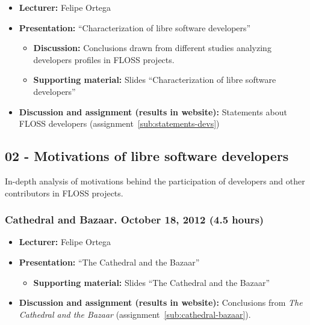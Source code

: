 \documentclass[a4paper]{article}
\begin{document}
\begin{itemize}
\item \textbf{Lecturer:} Felipe Ortega
\item \textbf{Presentation:} ``Characterization of libre software developers''
  \begin{itemize}
  \item \textbf{Discussion:} Conclusions drawn from different studies analyzing developers profiles in FLOSS projects.
  \item \textbf{Supporting material:} Slides ``Characterization of libre software developers''
  \end{itemize}
\item \textbf{Discussion and assignment (results in website):} Statements about FLOSS developers (assignment~\ref{sub:statements-devs})
\end{itemize}

\subsection{02 - Motivations of libre software developers}

In-depth analysis of motivations behind the participation of developers and other contributors in FLOSS projects.

\subsubsection{Cathedral and Bazaar. October 18, 2012 (4.5 hours)}

\begin{itemize}
\item \textbf{Lecturer:} Felipe Ortega
\item \textbf{Presentation:} ``The Cathedral and the Bazaar''
  \begin{itemize}
  \item \textbf{Supporting material:} Slides ``The Cathedral and the Bazaar''
  \end{itemize}
\item \textbf{Discussion and assignment (results in website):} Conclusions from \textit{The Cathedral and the Bazaar} (assignment~\ref{sub:cathedral-bazaar}).
\end{itemize}
\end{document}
